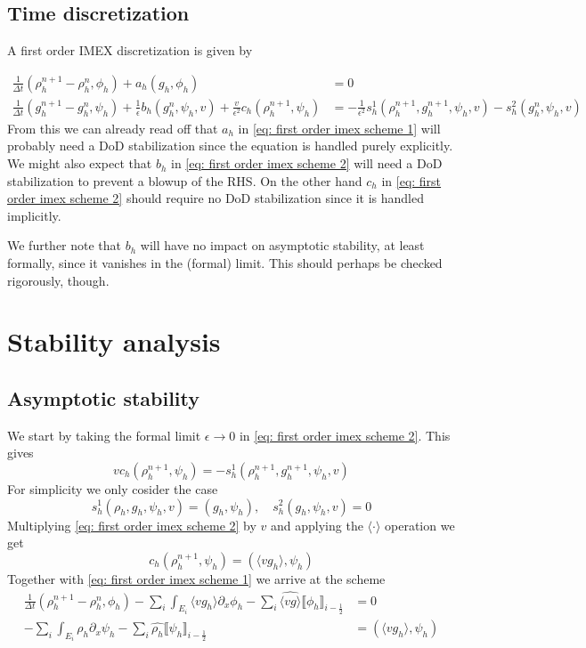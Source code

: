\documentclass[]{article}
\begin{document}
\subsection{Time discretization}

A first order IMEX discretization is given by

\begin{subequations}
\begin{align}
\label{eq: first order imex scheme 1}  \frac{1}{\Delta t} (\rho_h^{n+1} - \rho_h^n, \phi_h) + a_h(g_h, \phi_h) & = 0 \\
\label{eq: first order imex scheme 2} \frac{1}{\Delta t} (g_h^{n+1} - g_h^n, \psi_h) + \frac{1}{\epsilon} b_h(g_h^n, \psi_h, v) + \frac{v}{\epsilon^2} c_h(\rho_h^{n+1}, \psi_h) & = - \frac{1}{\epsilon^2}s_h^1(\rho_h^{n+1}, g_h^{n+1}, \psi_h, v) - s_h^2(g_h^n, \psi_h, v)
\end{align}
\end{subequations}
From this we can already read off that $a_h$ in \eqref{eq: first order imex scheme 1} will probably need a DoD stabilization since the equation is handled purely explicitly. We might also expect that $b_h$ in \eqref{eq: first order imex scheme 2} will need a DoD stabilization to prevent a blowup of the RHS. On the other hand $c_h$ in \eqref{eq: first order imex scheme 2} should require no DoD stabilization since it is handled implicitly.

We further note that $b_h$ will have no impact on asymptotic stability, at least formally, since it vanishes in the (formal) limit. This should perhaps be checked rigorously, though.

\section{Stability analysis}

\subsection{Asymptotic stability}

We start by taking the formal limit $\epsilon \to 0$ in \eqref{eq: first order imex scheme 2}. This gives
\[
v c_h (\rho_h^{n+1}, \psi_h) = - s_h^1 (\rho_h^{n+1}, g_h^{n+1}, \psi_h, v)
\]
For simplicity we only cosider the case
\[
s_h^1(\rho_h, g_h, \psi_h, v) = (g_h, \psi_h), \quad s_h^2(g_h, \psi_h, v) = 0
\]
Multiplying \eqref{eq: first order imex scheme 2} by $v$ and applying the $\langle \cdot \rangle$ operation we get
\[
c_h(\rho_h^{n+1}, \psi_h) = (\langle vg_h \rangle, \psi_h)
\]
Together with \eqref{eq: first order imex scheme 1} we arrive at the scheme
\begin{align*}
	\frac{1}{\Delta t} (\rho_h^{n+1} - \rho_h^n, \phi_h) - \sum_i \int_{E_i} \langle v g_h \rangle \partial_x \phi_h - \sum_{i} \widehat{\langle v g \rangle} \llbracket \phi_h \rrbracket_{i-\frac{1}{2}} & = 0\\
	- \sum_i \int_{E_i} \rho_h \partial_x \psi_h - \sum_i \widehat{ \rho_h} \llbracket \psi_h \rrbracket_{i - \frac{1}{2}}  & = (\langle vg_h \rangle, \psi_h)
\end{align*}
\end{document}
